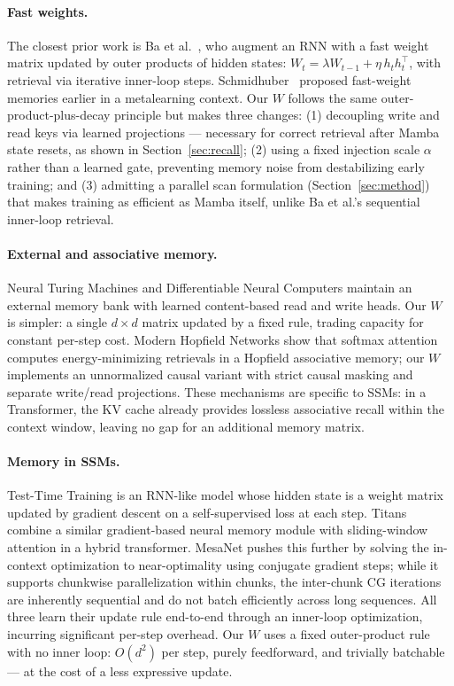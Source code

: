 \documentclass{article}
\begin{document}
\paragraph{Fast weights.}
The closest prior work is Ba et al.~\citep{ba2016using}, who augment an RNN with a fast weight matrix updated by outer products of hidden states: $W_t = \lambda W_{t-1} + \eta\, h_t h_t^\top$, with retrieval via iterative inner-loop steps. Schmidhuber~\citep{schmidhuber1992learning} proposed fast-weight memories earlier in a metalearning context. Our $W$ follows the same outer-product-plus-decay principle but makes three changes: (1) decoupling write and read keys via learned projections --- necessary for correct retrieval after Mamba state resets, as shown in Section~\ref{sec:recall}; (2) using a fixed injection scale $\alpha$ rather than a learned gate, preventing memory noise from destabilizing early training; and (3) admitting a parallel scan formulation (Section~\ref{sec:method}) that makes training as efficient as Mamba itself, unlike Ba et al.'s sequential inner-loop retrieval.

\paragraph{External and associative memory.}
Neural Turing Machines \citep{graves2014neural} and Differentiable Neural Computers \citep{graves2016hybrid} maintain an external memory bank with learned content-based read and write heads. Our $W$ is simpler: a single $d \times d$ matrix updated by a fixed rule, trading capacity for constant per-step cost. Modern Hopfield Networks \citep{ramsauer2021hopfield} show that softmax attention computes energy-minimizing retrievals in a Hopfield associative memory; our $W$ implements an unnormalized causal variant with strict causal masking and separate write/read projections. These mechanisms are specific to SSMs: in a Transformer, the KV cache already provides lossless associative recall within the context window, leaving no gap for an additional memory matrix.

\paragraph{Memory in SSMs.}
Test-Time Training \citep[TTT;][]{sun2024learning} is an RNN-like model whose hidden state is a weight matrix updated by gradient descent on a self-supervised loss at each step. Titans \citep{behrouz2024titans} combine a similar gradient-based neural memory module with sliding-window attention in a hybrid transformer. MesaNet \citep{von2025mesanet} pushes this further by solving the in-context optimization to near-optimality using conjugate gradient steps; while it supports chunkwise parallelization within chunks, the inter-chunk CG iterations are inherently sequential and do not batch efficiently across long sequences. All three learn their update rule end-to-end through an inner-loop optimization, incurring significant per-step overhead. Our $W$ uses a fixed outer-product rule with no inner loop: $O(d^2)$ per step, purely feedforward, and trivially batchable --- at the cost of a less expressive update.
\end{document}
